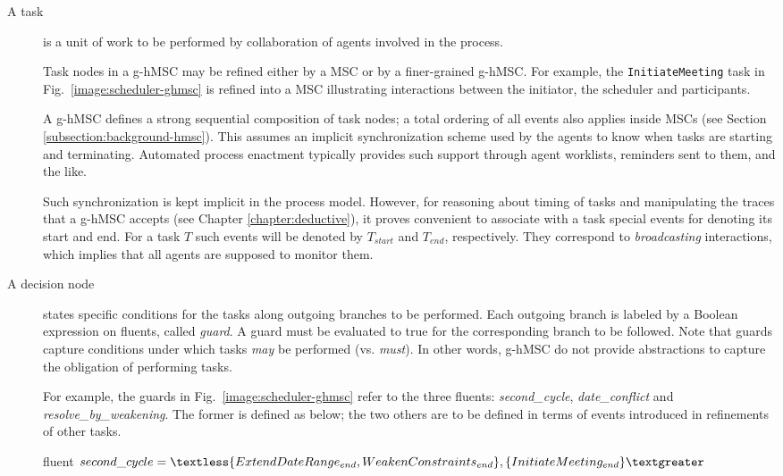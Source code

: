 \begin{description}
\item[A task] is a unit of work to be performed by collaboration of agents involved in the process. 

Task nodes in a g-hMSC may be refined either by a MSC or by a finer-grained g-hMSC. For example, the \texttt{InitiateMeeting} task in Fig.~\ref{image:scheduler-ghmsc} is refined into a MSC illustrating interactions between the initiator, the scheduler and participants. 

A g-hMSC defines a strong sequential composition of task nodes; a total ordering of all events also applies inside MSCs (see Section \ref{subsection:background-hmsc}). This assumes an implicit synchronization scheme used by the agents to know when tasks are starting and terminating. Automated process enactment typically provides such support through agent worklists, reminders sent to them, and the like. 

Such synchronization is kept implicit in the process model. However, for reasoning about timing of tasks and manipulating the traces that a g-hMSC accepts (see Chapter \ref{chapter:deductive}), it proves convenient to associate with a task special events for denoting its start and end. For a task $T$ such events will be denoted by $T_{start}$ and $T_{end}$, respectively. They correspond to \emph{broadcasting} interactions, which implies that all agents are supposed to monitor them.

\item[A decision node] states specific conditions for the tasks along outgoing branches to be performed. Each outgoing branch is labeled by a Boolean expression on fluents, called \emph{guard}. A guard must be evaluated to true for the corresponding branch to be followed. Note that guards capture conditions under which tasks \emph{may} be performed (vs. \emph{must}). In other words, g-hMSC do not provide abstractions to capture the obligation of performing tasks.

For example, the guards in Fig.~\ref{image:scheduler-ghmsc} refer to the three fluents: \emph{second\_cycle}, \emph{date\_conflict} and \emph{resolve\_by\_weakening}. The former is defined as below; the two others are to be defined in terms of events introduced in refinements of other tasks.
\begin{center}
fluent $second\_cycle = \textless \{ ExtendDateRange_{end}, \newline WeakenConstraints_{end} \},
 \{ InitiateMeeting_{end} \} \textgreater $\\
\end{center}


\end{description}
